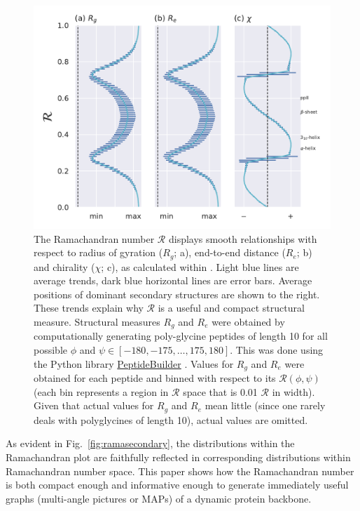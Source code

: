 \documentclass[fleqn,10pt,lineno]{wlpeerj} %
\newcommand{\Fig}[1]{Fig.~\ref{#1}}
\newcommand{\rr}{$\mathcal{R}$\xspace}
\begin{document}
\begin{figure}[t!]
\begin{adjustwidth}{-1in}{0in} %
\centering
\includegraphics[width=0.6\linewidth]{automated_figures/fig_r_intro.pdf}
\caption{The Ramachandran number \rr displays smooth relationships with respect to radius of gyration ($R_g$; a), end-to-end distance ($R_e$; b) and chirality ($\chi$; c), as calculated within \cite{Mannige2017}. Light blue lines are average trends, dark blue horizontal lines are error bars. Average positions of dominant secondary structures are shown to the right. These trends explain why \rr is a useful and compact structural measure. Structural measures $R_g$ and $R_e$ were obtained by computationally generating poly-glycine peptides of length 10 for all possible $\phi$ and $\psi \in [-180,-175,\ldots,175,180]$. This was done using the Python library \href{https://github.com/mtien/PeptideBuilder}{PeptideBuilder} \citep{Tien2013}. Values for $R_g$ and $R_e$ were obtained for each peptide and binned with respect to its {$\mathcal{R}(\phi,\psi)$} (each bin represents a region in \rr space that is 0.01 \rr in width). Given that actual values for $R_g$ and $R_e$ mean little (since one rarely deals with polyglycines of length 10), actual values are omitted.\label{fig:r_smooth}} 
\end{adjustwidth}
\end{figure}



As evident in \Fig{fig:ramasecondary}, the distributions within the Ramachandran plot are faithfully reflected in corresponding distributions within Ramachandran number space. This paper shows how the Ramachandran number is both compact enough and informative enough to generate immediately useful graphs (multi-angle pictures or MAPs) of a dynamic protein backbone.
\end{document}
